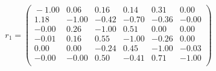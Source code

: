 \documentclass[10pt,a4paper]{article}
\begin{document}
 \begin{equation*} r_1  =  %
\begin{pmatrix}{}
  -1.00 & 0.06 & 0.16 & 0.14 & 0.31 & 0.00 \\ 
  1.18 & -1.00 & -0.42 & -0.70 & -0.36 & -0.00 \\ 
  -0.00 & 0.26 & -1.00 & 0.51 & 0.00 & 0.00 \\ 
  -0.01 & 0.16 & 0.55 & -1.00 & -0.26 & 0.00 \\ 
  0.00 & 0.00 & -0.24 & 0.45 & -1.00 & -0.03 \\ 
  -0.00 & -0.00 & 0.50 & -0.41 & 0.71 & -1.00 \\ 
  \end{pmatrix}
 \end{equation*} 
\end{document}
